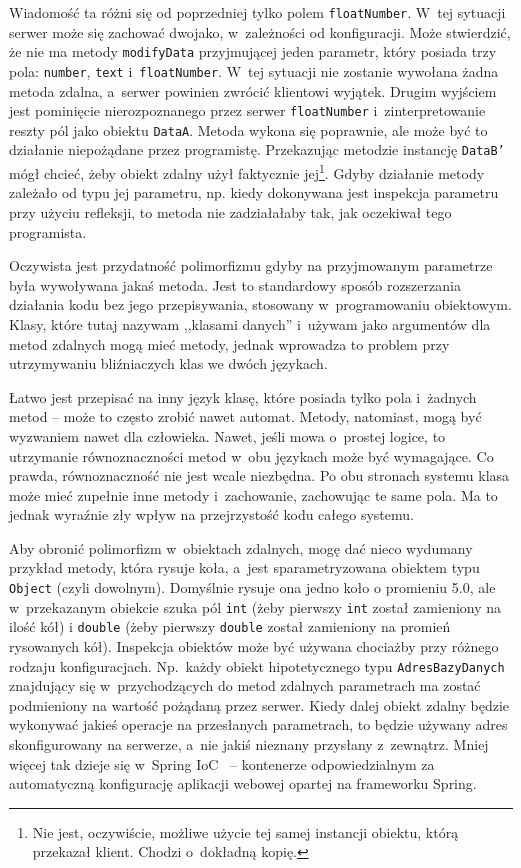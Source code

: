Wiadomość ta różni się od poprzedniej tylko polem \texttt{floatNumber}. W~tej sytuacji serwer może się zachować dwojako, w~zależności od konfiguracji.
Może stwierdzić, że nie ma metody \texttt{modifyData} przyjmującej jeden parametr, który posiada trzy pola: \texttt{number}, \texttt{text} i~\texttt{floatNumber}. W~tej sytuacji nie zostanie wywołana żadna metoda zdalna, a~serwer powinien zwrócić klientowi wyjątek.
Drugim wyjściem jest pominięcie nierozpoznanego przez serwer \texttt{floatNumber} i~zinterpretowanie reszty pól jako obiektu \texttt{DataA}.
Metoda wykona się poprawnie, ale może być to działanie niepożądane przez programistę. Przekazując metodzie instancję \texttt{DataB'} mógł chcieć, żeby obiekt zdalny użył faktycznie jej\footnote{Nie jest, oczywiście, możliwe użycie tej samej instancji obiektu, którą przekazał klient. Chodzi o~dokładną kopię.}. Gdyby działanie metody zależało od typu jej parametru, np. kiedy dokonywana jest inspekcja parametru przy użyciu refleksji, to metoda nie zadziałałaby tak, jak oczekiwał tego programista.

Oczywista jest przydatność polimorfizmu gdyby na przyjmowanym parametrze była wywoływana jakaś metoda. Jest to standardowy sposób rozszerzania działania kodu bez jego przepisywania, stosowany w~programowaniu obiektowym.
Klasy, które tutaj nazywam ,,klasami danych'' i~używam jako argumentów dla metod zdalnych mogą mieć metody, jednak wprowadza to problem przy utrzymywaniu bliźniaczych klas we dwóch językach.

Łatwo jest przepisać na inny język klasę, które posiada tylko pola i~żadnych metod -- może to często zrobić nawet automat.
Metody, natomiast, mogą być wyzwaniem nawet dla człowieka. Nawet, jeśli mowa o~prostej logice, to utrzymanie równoznaczności metod w~obu językach może być wymagające.
Co prawda, równoznaczność nie jest wcale niezbędna. Po obu stronach systemu klasa może mieć zupełnie inne metody i~zachowanie, zachowując te same pola. Ma to jednak wyraźnie zły wpływ na przejrzystość kodu całego systemu.

Aby obronić polimorfizm w~obiektach zdalnych, mogę dać nieco wydumany przykład metody, która rysuje koła, a~jest sparametryzowana obiektem typu \texttt{Object} (czyli dowolnym). Domyślnie rysuje ona jedno koło o promieniu 5.0, ale w~przekazanym obiekcie szuka pól \texttt{int} (żeby pierwszy \texttt{int} został zamieniony na ilość kół) i \texttt{double} (żeby pierwszy \texttt{double} został zamieniony na promień rysowanych kół).
Inspekcja obiektów może być używana chociażby przy różnego rodzaju konfiguracjach. Np.\ każdy obiekt hipotetycznego typu \texttt{AdresBazyDanych} znajdujący się w~przychodzących do metod zdalnych parametrach ma zostać podmieniony na wartość pożądaną przez serwer. Kiedy dalej obiekt zdalny będzie wykonywać jakieś operacje na przesłanych parametrach, to będzie używany adres skonfigurowany na serwerze, a~nie jakiś nieznany przysłany z~zewnątrz.
Mniej więcej tak dzieje się w~Spring IoC~\cite{sping-ioc} -- kontenerze odpowiedzialnym za automatyczną konfigurację aplikacji webowej opartej na frameworku Spring.

